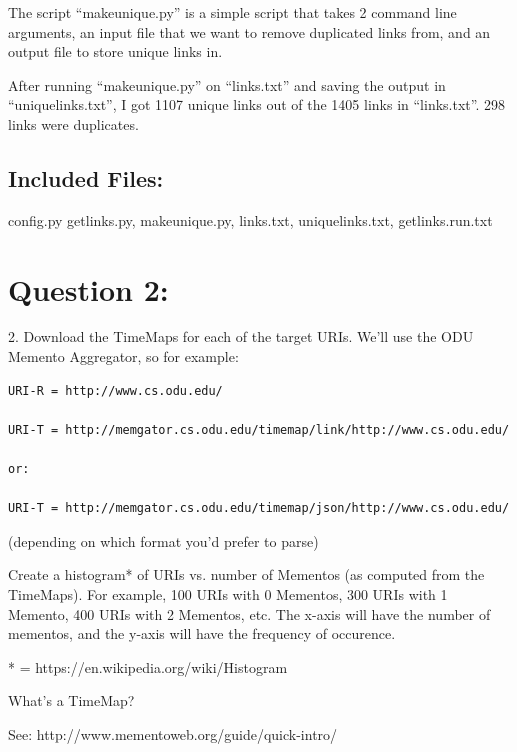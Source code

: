\documentclass[a4paper, 11pt]{article}
\begin{document}
The script ``makeunique.py'' is a simple script that takes 2 command line arguments, an input file that we want to remove duplicated links from, and an output file to store unique links in.



After running ``makeunique.py'' on ``links.txt'' and saving the output in ``uniquelinks.txt'', I got 1107 unique links out of the 1405 links in ``links.txt''. 298 links were duplicates.



\subsection*{Included Files:}
config.py getlinks.py, makeunique.py, links.txt, uniquelinks.txt, getlinks.run.txt

\section*{Question 2:}
2.  Download the TimeMaps for each of the target URIs.  We'll use the ODU 
Memento Aggregator, so for example:

\begin{lstlisting}[language=bash,label=Command:, breakatwhitespace=〈false), caption=Command:]
URI-R = http://www.cs.odu.edu/

URI-T = http://memgator.cs.odu.edu/timemap/link/http://www.cs.odu.edu/

or:

URI-T = http://memgator.cs.odu.edu/timemap/json/http://www.cs.odu.edu/
\end{lstlisting}
(depending on which format you'd prefer to parse)

Create a histogram* of URIs vs. number of Mementos (as computed
from the TimeMaps).  For example, 100 URIs with 0 Mementos, 300
URIs with 1 Memento, 400 URIs with 2 Mementos, etc.  The x-axis
will have the number of mementos, and the y-axis will have the
frequency of occurence.

* = https://en.wikipedia.org/wiki/Histogram

What's a TimeMap?  

See: http://www.mementoweb.org/guide/quick-intro/
\end{document}
